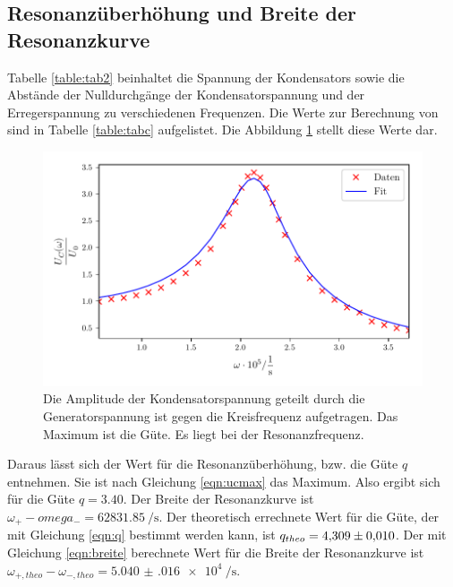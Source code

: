 \subsection{Resonanzüberhöhung und Breite der Resonanzkurve}
Tabelle \ref{table:tab2} beinhaltet die Spannung der Kondensators
sowie die Abstände der Nulldurchgänge der Kondensatorspannung
und der Erregerspannung zu verschiedenen Frequenzen.
Die Werte zur Berechnung von %
sind in Tabelle \ref{table:tabc} aufgelistet.
Die Abbildung \ref{fig:plotc} stellt diese Werte dar.


\begin{figure}
  \centering
  \includegraphics{build/plotc.pdf}
  \caption{Die Amplitude der Kondensatorspannung geteilt durch die Generatorspannung
  ist gegen die Kreisfrequenz aufgetragen. Das Maximum ist die Güte. Es liegt bei der
  Resonanzfrequenz.}
  \label{fig:plotc}
\end{figure}
\noindent Daraus lässt sich der Wert für die Resonanzüberhöhung, bzw. die Güte $q$ entnehmen.
Sie ist nach Gleichung \eqref{eqn:ucmax} das Maximum.
Also ergibt sich für die Güte $q = \num{3.40}$.
Der Breite der Resonanzkurve ist
$\omega_{+} - omega_{-} = \SI[per-mode=fraction]{62831.85}{\per\second}$. %
\newline
Der theoretisch errechnete Wert für die Güte, der mit Gleichung
\eqref{eqn:q} bestimmt werden kann, ist $q_{theo} = \num{4.309 \pm.010}$.
Der mit Gleichung \eqref{eqn:breite} berechnete Wert für die Breite der
Resonanzkurve ist
$\omega_{+,theo} - \omega_{-,theo} = \SI[per-mode=fraction]{5.040(016)e4}{\per\second}$.


